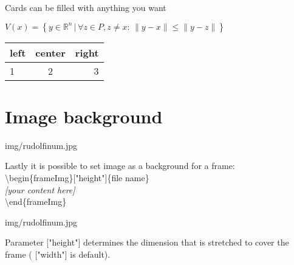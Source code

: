 \documentclass[aspectratio=1610,dvipsnames, noamsthm]{beamer}
\begin{document}
\usePrimaryLime
\useAccentLightBlue



\begin{frame}{Cards can be filled with anything you want}

  \begin{card}
    \centering$V(x) = \left\{ y \in \mathbb{R}^n \,|\, \forall z \in P, z\neq x:\, \|y-x\|\leq\|y-z\| \right\}$
  \end{card}

  \begin{card}
    \centering
    \begin{tabular}{lcr}
      left & center & right \\
      \hline
      1    & 2      & 3     \\
    \end{tabular}
  \end{card}

\end{frame}





\usePrimaryGreen
\useAccentLime


\section{Image background}
\begin{frameImg}{img/rudolfinum.jpg}
  \vspace*{60mm}
  \begin{cardTiny}
    Lastly it is possible to set image as a background for a frame:\\[2mm]
    {\color{accent} \textbackslash begin\{frameImg\}["height"]\{file name\}\\[2mm]}
    \null\qquad \textit{[your content here]}\\[2mm]
    {\color{accent} \textbackslash end\{frameImg\}}
  \end{cardTiny}
\end{frameImg}

\usePrimaryYellow
\useAccentGreen

\begin{frameImg}[height]{img/rudolfinum.jpg}
  \vspace*{60mm}
  \begin{cardTiny}
    Parameter {\color{accent} ["height"]} determines the dimension that is stretched to cover the frame ({\color{accent} ["width"]} is default).
  \end{cardTiny}
\end{frameImg}
\end{document}
